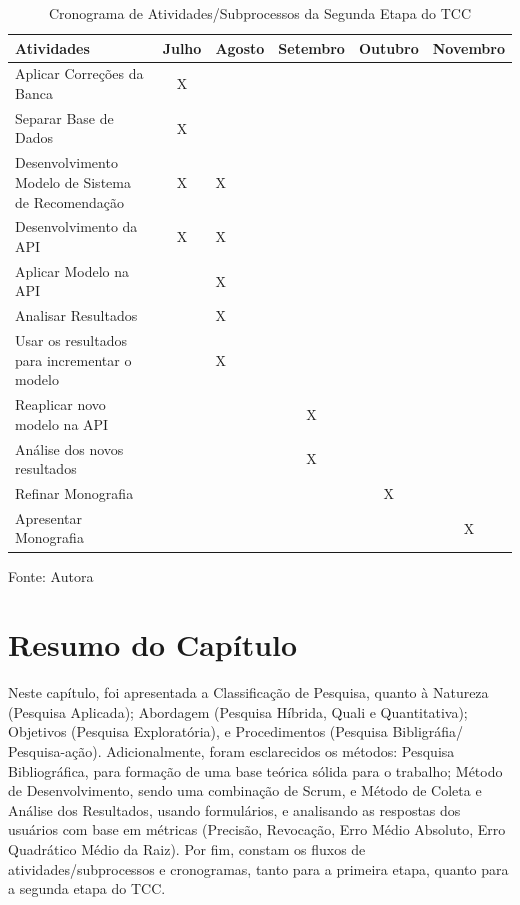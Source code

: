 \begin{table}[htbp]
    \centering
    \begin{threeparttable}
        \caption{Cronograma de Atividades/Subprocessos da Segunda Etapa do TCC}
        \label{tab:4}
        \begin{tabular}{|>{\raggedright\arraybackslash}m{6cm} c m{1cm} c c c|}
        \hline  
        Atividades & Julho & Agosto & Setembro & Outubro & Novembro \\
        \hline 
        Aplicar Correções da Banca & X &  &  &  & \\
        \hline 
        Separar Base de Dados & X &  &  &  & \\
        \hline 
        Desenvolvimento Modelo de Sistema de Recomendação & X & X &  &  & \\
        \hline 
        Desenvolvimento da API & X & X &  &  & \\
        \hline 
        Aplicar Modelo na API &  & X &  &  & \\
        \hline 
        Analisar Resultados &  & X & &  & \\
        \hline 
        Usar os resultados para incrementar o modelo &  & X & &  & \\
        \hline 
        Reaplicar novo modelo na API &  &  & X &  & \\
        \hline 
        Análise dos novos resultados &  &  & X &  & \\
        \hline 
        Refinar Monografia &  &  &  & X & \\
        \hline
        Apresentar Monografia &  &  &  & & X \\
        \hline  
        \end{tabular}
        \begin{tablenotes}
            \small
            \centering
            \item Fonte: Autora
        \end{tablenotes}
    \end{threeparttable}
\end{table}

\section{Resumo do Capítulo}\label{sec:resmet}
Neste capítulo, foi apresentada a Classificação de Pesquisa, quanto à Natureza (Pesquisa Aplicada); Abordagem 
(Pesquisa Híbrida, Quali e Quantitativa); Objetivos (Pesquisa Exploratória), e Procedimentos (Pesquisa Bibligráfia/ 
Pesquisa-ação). Adicionalmente, foram esclarecidos os métodos: Pesquisa Bibliográfica, para formação de uma base 
teórica sólida para o trabalho; Método de Desenvolvimento, sendo uma combinação de Scrum, e 
Método de Coleta e Análise dos Resultados, usando formulários, e analisando as respostas dos usuários com 
base em métricas (Precisão, Revocação, Erro Médio Absoluto, Erro Quadrático Médio da Raiz). Por fim, constam os fluxos 
de atividades/subprocessos e cronogramas, tanto para a primeira etapa, quanto para a segunda etapa do TCC.
